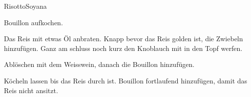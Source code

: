 
\begin{recipe}[]{Risotto}{Soyana}{}



\step%
Bouillon aufkochen.

\step%
Das Reis mit etwas \"Ol anbraten. Knapp bevor das Reis golden ist, die Zwiebeln
hinzuf\"ugen. Ganz am schluss noch kurz den Knoblauch mit in den Topf werfen.

\step%
Abl\"oschen mit dem Weisswein, danach die Bouillon hinzuf\"ugen.

\step%
K\"ocheln lassen bis das Reis durch ist. Bouillon fortlaufend hinzuf\"ugen,
damit das Reis nicht ansitzt.


\end{recipe}

